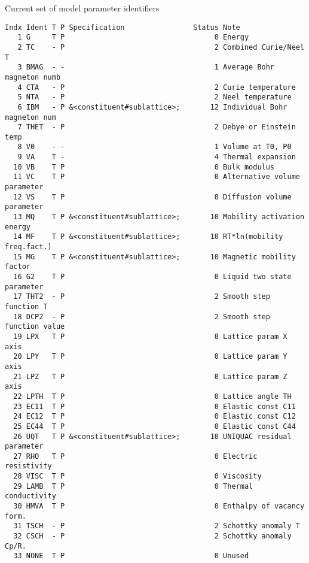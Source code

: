 \documentclass[11pt]{article}
\begin{document}
\begin{table}[!h]
  \caption{Current set of model parameter identifiers}\label{tab:mpis}
  {\small
\begin{verbatim}
Indx Ident T P Specification                Status Note
   1 G     T P                                   0 Energy
   2 TC    - P                                   2 Combined Curie/Neel T
   3 BMAG  - -                                   1 Average Bohr magneton numb
   4 CTA   - P                                   2 Curie temperature
   5 NTA   - P                                   2 Neel temperature
   6 IBM   - P &<constituent#sublattice>;       12 Individual Bohr magneton num
   7 THET  - P                                   2 Debye or Einstein temp
   8 V0    - -                                   1 Volume at T0, P0
   9 VA    T -                                   4 Thermal expansion
  10 VB    T P                                   0 Bulk modulus
  11 VC    T P                                   0 Alternative volume parameter
  12 VS    T P                                   0 Diffusion volume parameter
  13 MQ    T P &<constituent#sublattice>;       10 Mobility activation energy
  14 MF    T P &<constituent#sublattice>;       10 RT*ln(mobility freq.fact.)
  15 MG    T P &<constituent#sublattice>;       10 Magnetic mobility factor
  16 G2    T P                                   0 Liquid two state parameter
  17 THT2  - P                                   2 Smooth step function T
  18 DCP2  - P                                   2 Smooth step function value
  19 LPX   T P                                   0 Lattice param X axis
  20 LPY   T P                                   0 Lattice param Y axis
  21 LPZ   T P                                   0 Lattice param Z axis
  22 LPTH  T P                                   0 Lattice angle TH
  23 EC11  T P                                   0 Elastic const C11
  24 EC12  T P                                   0 Elastic const C12
  25 EC44  T P                                   0 Elastic const C44
  26 UQT   T P &<constituent#sublattice>;       10 UNIQUAC residual parameter
  27 RHO   T P                                   0 Electric resistivity
  28 VISC  T P                                   0 Viscosity
  29 LAMB  T P                                   0 Thermal conductivity
  30 HMVA  T P                                   0 Enthalpy of vacancy form.
  31 TSCH  - P                                   2 Schottky anomaly T
  32 CSCH  - P                                   2 Schottky anomaly Cp/R.
  33 NONE  T P                                   0 Unused
\end{verbatim}
  }
\end{table}
 
\end{document}
